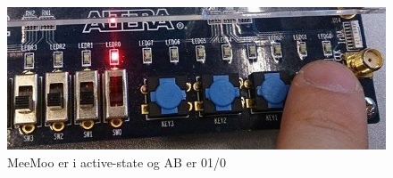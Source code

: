 \begin{enumerate}
\begin{figure}[h]
	\centering
	\includegraphics[scale=0.8]{pictures/Oevelse7/opg1/BA010MooMeeACTIVE.JPG}
	\caption{MeeMoo er i active-state og AB er 01/0}
	\label{fig:BA010MooMeeACTIVE}
\end{figure}

\end{enumerate}
	\newpage